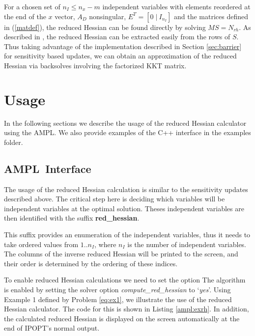\documentclass[letter, 11pt]{article}
\newcommand{\AMPL}{AMPL}
\newcommand{\redhessopt}{compute\_red\_hessian}
\newcommand{\redhess}{red\_hessian}
\begin{document}
For a chosen set of $n_I \leq n_x -
m$ independent variables with elements reordered at the end of the
$x$ vector, $A_D$ nonsingular, $E^T = [0 \;|\: I_{n_I}]$
and the matrices defined in (\ref{matdef}), the reduced Hessian can be
found directly by solving $M S = N_{rh}$. As described in \cite{pirnay:2011},
the reduced Hessian can be
extracted easily from the rows of $S$. Thus taking advantage of the
implementation described in Section \ref{sec:barrier} for sensitivity
based updates, we can obtain an approximation of the reduced Hessian
via backsolves involving the factorized KKT matrix.

\section{Usage}

In the following sections we describe the usage of the reduced Hessian
calculator using the \AMPL. We also provide examples of
the C++ interface in the examples folder.


\subsection{\AMPL\ Interface}

The usage of the reduced Hessian calculation is similar to the sensitivity updates described above.
The critical step here is deciding which variables will be independent variables at the optimal solution.
Theses independent variables are then identified with the suffix \textbf{\redhess}.

This suffix provides an enumeration of the independent variables, thus it needs to take ordered values from
$1..n_I$, where $n_I$ is the number of independent variables. The columns of the inverse reduced Hessian will be printed to
the screen, and their order is determined by the ordering of these indices.

To enable reduced Hessian calculations we need to set the option
The algorithm is enabled by setting the solver option \emph{\redhessopt} to `\emph{yes}'.
Using Example 1 defined by Problem \eqref{eq:ex1}, we illustrate the use of the
reduced Hessian calculator. The code for this is shown in Listing \ref{ampl:exrh}.
In addition, the calculated reduced Hessian is displayed on the screen automatically
at the end of IPOPT's normal output.
\end{document}
